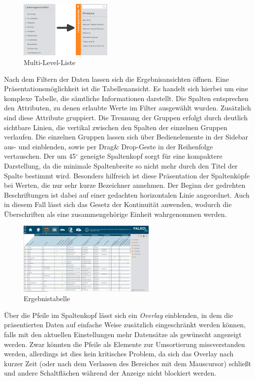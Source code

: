 \begin{figure}[H]
 \centering
 \includegraphics[width=0.4\textwidth]{grafiken/mll_combined.png}
 \caption{Multi-Level-Liste}
 \label{fig:mll}
\end{figure}
Nach dem Filtern der Daten lassen sich die Ergebnisansichten öffnen. Eine Präsentationsmöglichkeit ist die Tabellenansicht. Es handelt sich hierbei um eine komplexe Tabelle, die sämtliche Informationen darstellt. Die Spalten entsprechen den Attributen, zu denen erlaubte Werte im Filter ausgewählt wurden. Zusätzlich sind diese Attribute gruppiert. Die Trennung der Gruppen erfolgt durch deutlich sichtbare Linien, die vertikal zwischen den Spalten der einzelnen Gruppen verlaufen. Die einzelnen Gruppen lassen sich über Bedienelemente in der Sidebar aus- und einblenden, sowie per Drag\& Drop-Geste in der Reihenfolge vertauschen. Der um 45$^{\circ}$ geneigte Spaltenkopf sorgt für eine kompaktere Darstellung, da die minimale Spaltenbreite so nicht mehr durch den Titel der Spalte bestimmt wird. Besonders hilfreich ist diese Präsentation der Spaltenköpfe bei Werten, die nur sehr kurze Bezeichner annehmen. Der Beginn der gedrehten Beschriftungen ist dabei auf einer gedachten horizontalen Linie angeordnet. Auch in diesem Fall lässt sich das Gesetz der Kontinuität anwenden, wodurch die Überschriften als eine zusammengehörige Einheit wahrgenommen werden.\par
\begin{figure}[H]
 \centering
 \includegraphics[width=0.6\textwidth]{grafiken/full_result_table.png}
 \caption{Ergebnistabelle}
 \label{fig:resultTable}
\end{figure}
Über die Pfeile im Spaltenkopf lässt sich ein \textit{Overlay} einblenden, in dem die präsentierten Daten auf einfache Weise zusätzlich eingeschränkt werden können, falls mit den aktuellen Einstellungen mehr Datensätze als gewünscht angezeigt werden. Zwar könnten die Pfeile als Elemente zur Umsortierung missverstanden werden, allerdings ist dies kein kritisches Problem, da sich das Overlay nach kurzer Zeit (oder nach dem Verlassen des Bereiches mit dem Mauscursor) schließt und andere Schaltflächen während der Anzeige nicht blockiert werden.\par
